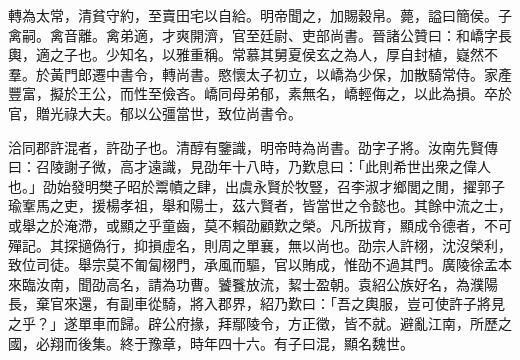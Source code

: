 \begin{pinyinscope}
轉為太常，清貧守約，至賣田宅以自給。明帝聞之，加賜穀帛。薨，謚曰簡侯。子禽嗣。禽音離。禽弟適，才爽開濟，官至廷尉、吏部尚書。晉諸公贊曰：和嶠字長輿，適之子也。少知名，以雅重稱。常慕其舅夏侯玄之為人，厚自封植，嶷然不羣。於黃門郎遷中書令，轉尚書。愍懷太子初立，以嶠為少保，加散騎常侍。家產豐富，擬於王公，而性至儉吝。嶠同母弟郁，素無名，嶠輕侮之，以此為損。卒於官，贈光祿大夫。郁以公彊當世，致位尚書令。

洽同郡許混者，許劭子也。清醇有鑒識，明帝時為尚書。劭字子將。汝南先賢傳曰：召陵謝子微，高才遠識，見劭年十八時，乃歎息曰：「此則希世出衆之偉人也。」劭始發明樊子昭於鬻幘之肆，出虞永賢於牧豎，召李淑才鄉閭之閒，擢郭子瑜鞌馬之吏，援楊孝祖，舉和陽士，茲六賢者，皆當世之令懿也。其餘中流之士，或舉之於淹滯，或顯之乎童齒，莫不賴劭顧歎之榮。凡所拔育，顯成令德者，不可殫記。其探擿偽行，抑損虛名，則周之單襄，無以尚也。劭宗人許栩，沈沒榮利，致位司徒。舉宗莫不匍匐栩門，承風而驅，官以賄成，惟劭不過其門。廣陵徐孟本來臨汝南，聞劭高名，請為功曹。饕餮放流，絜士盈朝。袁紹公族好名，為濮陽長，棄官來還，有副車從騎，將入郡界，紹乃歎曰：「吾之輿服，豈可使許子將見之乎？」遂單車而歸。辟公府掾，拜鄢陵令，方正徵，皆不就。避亂江南，所歷之國，必翔而後集。終于豫章，時年四十六。有子曰混，顯名魏世。


\end{pinyinscope}